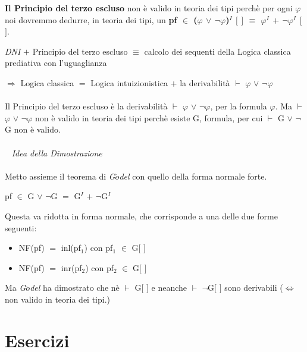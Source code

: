\noindent
\textbf{Il Principio del terzo escluso} non \`e valido in teoria dei tipi perch\`e per ogni $\varphi$ noi dovremmo dedurre, in teoria dei tipi, un \textbf{pf $\in$ ($\varphi$ $\vee$ $\neg\varphi$)$^I$ $[$ $]$ $\equiv$ $\varphi^I$ $+$ $\neg\varphi^I$ $[$ $]$}. 
\begin{center}
\textit{DNI} $+$ Principio del terzo escluso $\equiv$ calcolo dei sequenti della Logica classica prediativa con l'uguaglianza
\end{center}
\noindent
$\Rightarrow$ Logica classica $=$ Logica intuizionistica $+$ la derivabilit\`a $\vdash$ $\varphi$ $\vee$ $\neg\varphi$\\\\
\noindent
Il Principio del terzo escluso \`e la derivabilit\`a $\vdash$ $\varphi$ $\vee$ $\neg\varphi$, per la formula $\varphi$. Ma $\vdash$ $\varphi$ $\vee$ $\neg\varphi$ non \`e valido in teoria dei tipi perch\`e esiste G, formula, per cui $\vdash$ G $\vee$ $\neg$G non \`e valido.\\\\\
\noindent
\textit{Idea della Dimostrazione}\\\\
\noindent Metto assieme il teorema di \textit{G$\ddot{o}$del} con quello della forma normale forte.
\begin{center}pf $\in$ G $\vee$ $\neg$G $=$ G$^I$ $+$ $\neg$G$^I$\end{center}
Questa va ridotta in forma normale, che corrisponde a una delle due forme seguenti:
\begin{itemize}
\item NF(pf) $=$ inl(pf$_1$) con pf$_1$ $\in$ G$[$ $]$
\item NF(pf) $=$ inr(pf$_2$) con pf$_2$ $\in$ G$[$ $]$
\end{itemize}
Ma \textit{G$\ddot{o}$del} ha dimostrato che n\`e $\vdash$ G$[$ $]$ e neanche $\vdash$ $\neg$G$[$ $]$ sono derivabili ($\Leftrightarrow$ non valido in teoria dei tipi.)

\section{Esercizi}
\label{sec:cap10}
